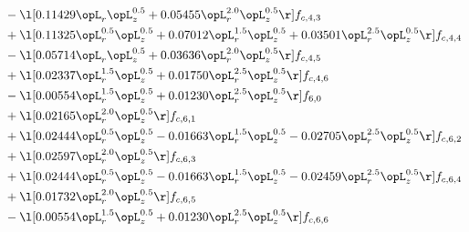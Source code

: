 \begin{alignat}{2}
& - \l[  0.11429 \opL_r \opL_z^{0.5} +  0.05455 \opL_r^{2.0} \opL_z^{0.5}  \r] f_{c,4,3} \nonumber \\ 
& + \l[  0.11325 \opL_r^{0.5} \opL_z^{0.5} +  0.07012 \opL_r^{1.5} \opL_z^{0.5} +  0.03501 \opL_r^{2.5} \opL_z^{0.5}  \r] f_{c,4,4} \nonumber \\ 
& - \l[  0.05714 \opL_r \opL_z^{0.5} +  0.03636 \opL_r^{2.0} \opL_z^{0.5}  \r] f_{c,4,5} \nonumber \\ 
& + \l[  0.02337 \opL_r^{1.5} \opL_z^{0.5} +  0.01750 \opL_r^{2.5} \opL_z^{0.5}  \r] f_{c,4,6} \nonumber \\ 
& - \l[  0.00554 \opL_r^{1.5} \opL_z^{0.5} +  0.01230 \opL_r^{2.5} \opL_z^{0.5}  \r] f_{6,0} \nonumber \\ 
& + \l[  0.02165 \opL_r^{2.0} \opL_z^{0.5}  \r] f_{c,6,1} \nonumber \\ 
& + \l[  0.02444 \opL_r^{0.5} \opL_z^{0.5}   -0.01663 \opL_r^{1.5} \opL_z^{0.5}   -0.02705 \opL_r^{2.5} \opL_z^{0.5}  \r] f_{c,6,2} \nonumber \\ 
& + \l[  0.02597 \opL_r^{2.0} \opL_z^{0.5}  \r] f_{c,6,3} \nonumber \\ 
& + \l[  0.02444 \opL_r^{0.5} \opL_z^{0.5}   -0.01663 \opL_r^{1.5} \opL_z^{0.5}   -0.02459 \opL_r^{2.5} \opL_z^{0.5}  \r] f_{c,6,4} \nonumber \\ 
& + \l[  0.01732 \opL_r^{2.0} \opL_z^{0.5}  \r] f_{c,6,5} \nonumber \\ 
& - \l[  0.00554 \opL_r^{1.5} \opL_z^{0.5} +  0.01230 \opL_r^{2.5} \opL_z^{0.5}  \r] f_{c,6,6} \nonumber \\ 
\end{alignat} 


